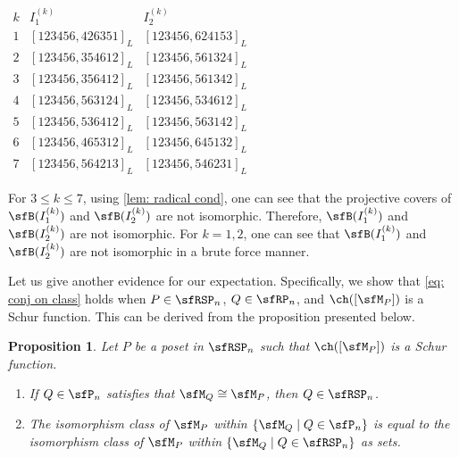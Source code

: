 \documentclass[12pt, reqno]{amsart}
\newtheorem{proposition}[theorem]{Proposition}
\theoremstyle{definition}
\numberwithin{equation}{section} \numberwithin{figure}{section}
\numberwithin{table}{section}
\begin{document}
\begin{table}[t]
\renewcommand*\arraystretch{1.2}
\centering
$\begin{array}{c|c|c}
 k & I_1^{(k)} & I_2^{(k)} 
\\ \hline \hline
1 & [123456, 426351]_L & [123456, 624153]_L 
\\ \hline
2 & [123456, 354612]_L & [123456, 561324]_L
\\ \hline
3 & [123456, 356412]_L & [123456, 561342]_L
\\ \hline
4 & [123456, 563124]_L &  [123456, 534612]_L
\\ \hline
5 & [123456, 536412]_L & [123456, 563142]_L
\\ \hline
6 & [123456, 465312]_L & [123456, 645132]_L
\\ \hline
7 & [123456, 564213]_L & [123456, 546231]_L
\end{array}$
\caption{Seven pairs $(I_1^{(k)}, I_2^{(k)})$ in $\mathfrak{A}_6$}
\label{tab: non des pres modules}
\end{table}
For $3 \leq k \leq 7$, 
using \cref{lem: radical cond}, 
one can see that the projective covers of $\sfB(I_1^{(k)})$ and $\sfB(I_2^{(k)})$ are not isomorphic.
Therefore, $\sfB(I_1^{(k)})$ and $\sfB(I_2^{(k)})$ are not isomorphic.
For $k = 1, 2$, one can see that $\sfB(I_1^{(k)})$ and $\sfB(I_2^{(k)})$ are not isomorphic  in a brute force manner.




Let us give another evidence for our expectation.
Specifically, we show that \cref{eq: conj on class} holds when $P \in \sfRSP_n$, $Q \in \sfRP_n$, and $\ch([\sfM_P])$ is a Schur function. 
This can be derived from the proposition presented below.



\begin{proposition}\label{prop: small evi for conj}
Let $P$ be a poset in $\sfRSP_n$ such that $\ch([\sfM_P])$ is a Schur function.

\begin{enumerate}[label = {\rm (\arabic*)}]
\item If $Q \in \sfP_n$ satisfies that $\sfM_Q \cong \sfM_P$, 
then $Q \in \sfRSP_n$.
\item  The isomorphism class of $\sfM_P$ within $\{\sfM_Q \mid Q \in \sfP_n \}$
is equal to the isomorphism class of $\sfM_P$ within $\{\sfM_Q \mid Q \in \sfRSP_n \}$ as sets.
\end{enumerate}
\end{proposition}
\end{document}
